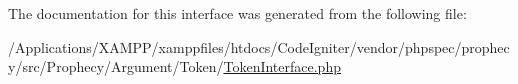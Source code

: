 The documentation for this interface was generated from the following file\+:\begin{DoxyCompactItemize}
\item 
/\+Applications/\+X\+A\+M\+P\+P/xamppfiles/htdocs/\+Code\+Igniter/vendor/phpspec/prophecy/src/\+Prophecy/\+Argument/\+Token/\mbox{\hyperlink{_token_interface_8php}{Token\+Interface.\+php}}\end{DoxyCompactItemize}
